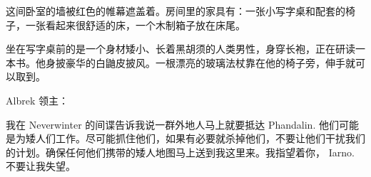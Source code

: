 \documentclass[letterpaper,twocolumn,openany,nodeprecatedcode]{dndbook}
\begin{document}
\begin{DndReadAloud}
  \begin{chinese}
    这间卧室的墙被红色的帷幕遮盖着。房间里的家具有：一张小写字桌和配套的椅子，一张看起来很舒适的床，一个木制箱子放在床尾。
  \end{chinese}
\end{DndReadAloud}

\begin{DndReadAloud}
  \begin{chinese}
    坐在写字桌前的是一个身材矮小、长着黑胡须的人类男性，身穿长袍，正在研读一本书。他身披豪华的白鼬皮披风。一根漂亮的玻璃法杖靠在他的椅子旁，伸手就可以取到。
  \end{chinese}
\end{DndReadAloud}

\begin{DndReadAloud}
  \begin{chinese}
    Albrek 领主：

    我在 Neverwinter 的间谍告诉我说一群外地人马上就要抵达 Phandalin. 他们可能是为矮人们工作。尽可能抓住他们，如果有必要就杀掉他们，不要让他们干扰我们的计划。确保任何他们携带的矮人地图马上送到我这里来。我指望着你， Iarno. 不要让我失望。
  \end{chinese}
\end{DndReadAloud}
\end{document}

